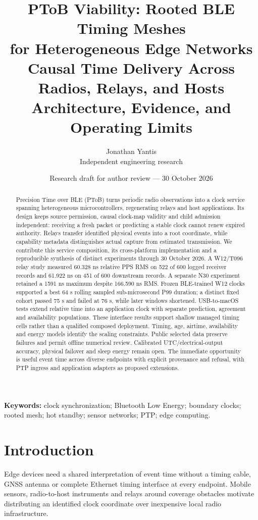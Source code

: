\documentclass[11pt,letterpaper]{article}
\title{\textbf{PToB Viability: Rooted BLE Timing Meshes\\for Heterogeneous Edge Networks}\\[5pt]\large Causal Time Delivery Across Radios, Relays, and Hosts\\Architecture, Evidence, and Operating Limits}
\author{Jonathan Yantis\\\small Independent engineering research}
\date{Research draft for author review --- 30 October 2026}
\begin{document}
\maketitle
\begin{abstract}
Precision Time over BLE (PToB) turns periodic radio observations into a clock service spanning heterogeneous microcontrollers, regenerating relays and host applications. Its design keeps source permission, causal clock-map validity and child admission independent: receiving a fresh packet or predicting a stable clock cannot renew expired authority. Relays transfer identified physical events into a root coordinate, while capability metadata distinguishes actual capture from estimated transmission. We contribute this service composition, its cross-platform implementation and a reproducible synthesis of distinct experiments through 30 October 2026. A W12/T096 relay study measured 60.328 ns relative PPS RMS on 522 of 600 logged receiver records and 61.922 ns on 451 of 600 downstream records. A separate N30 experiment retained a 1591 ns maximum despite 166.590 ns RMS. Frozen BLE-trained W12 clocks supported a best 64 s rolling sampled sub-microsecond P99 duration; a distinct fixed cohort passed 75 s and failed at 76 s, while later windows shortened. USB-to-macOS tests extend relative time into an application clock with separate prediction, agreement and availability populations. These interface results support shallow managed timing cells rather than a qualified composed deployment. Timing, age, airtime, availability and energy models identify the scaling constraints. Public selected data preserve failures and permit offline numerical review. Calibrated UTC/electrical-output accuracy, physical failover and sleep energy remain open. The immediate opportunity is useful event time across diverse endpoints with explicit provenance and refusal, with PTP ingress and application adapters as proposed extensions.
\end{abstract}
\noindent\textbf{Keywords:} clock synchronization; Bluetooth Low Energy; boundary clocks; rooted mesh; hot standby; sensor networks; PTP; edge computing.
\par{}

\section{Introduction}
Edge devices need a shared interpretation of event time without a timing cable, GNSS antenna or complete Ethernet timing interface at every endpoint. Mobile sensors, radio-to-host instruments and relays around coverage obstacles motivate distributing an identified clock coordinate over inexpensive local radio infrastructure.
\end{document}
